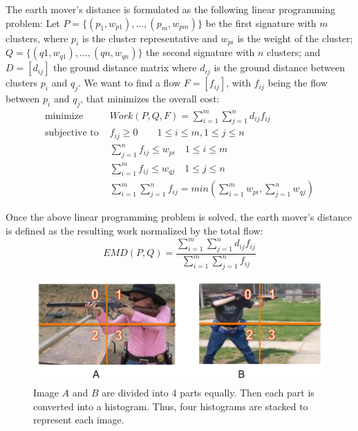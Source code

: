 \noindent The earth mover's distance is formulated as the following linear programming problem: Let $P = \{(p_1, w_{p1} ), . . . , (p_m , w_{pm} )\}$ be the first signature with $m$ clusters, where $p_i$ is the cluster representative and $w_{pi}$ is the weight of the cluster; $Q=\{(q1,w_{q1}),...,(qn,w_{qn})\}$ the second signature with $n$ clusters; and $D = [d_{ij}]$ the ground distance matrix where $d_{ij}$ is the ground distance between clusters $p_i$ and $q_j$. We want to find a flow $F = [f_{ij}]$, with $f_{ij}$ being the flow between $p_i$ and $q_j$, that minimizes the overall cost: 
\begin{eqnarray}
\text{minimize} & Work(P , Q, F) = \sum_{i=1}^{m}\sum_{j=1}^{n}d_{ij}f_{ij} \nonumber\\
\text{subjective to } & f_{ij} \geq 0 \quad \quad 1 \leq i \leq m,  1 \leq j \leq n \nonumber\\ 
& \sum_{j=1}^n f_{ij} \leq w_{pi} \quad 1 \leq i \leq m \nonumber\\
& \sum_{i=1}^m f_{ij} \leq w_{qj} \quad 1 \leq j \leq n \nonumber\\
& \sum_{i=1}^{m} \sum_{j=1}^n f_{ij} = min(\sum_{i=1}^m w_{pi}, \sum_{j=1}^n w_{qj}) 
\end{eqnarray}

\noindent Once the above linear programming problem is solved, the earth mover's distance is defined as the resulting work normalized by the total flow:
\begin{equation}
EMD(P, Q) = \frac{\sum_{i=1}^m \sum_{j=1}^n d_{ij} f_{ij}}{\sum_{i=1}^m\sum_{j=1}^n f_{ij}}
\end{equation}

\begin{figure}[!ht]
\centering
	\includegraphics[width=1\textwidth]{./image_EMD_Sample.png}
\caption{Image $A$ and $B$ are divided into 4 parts equally. Then each part is converted into a histogram. Thus, four histograms are stacked to represent each image.}
\end{figure}


